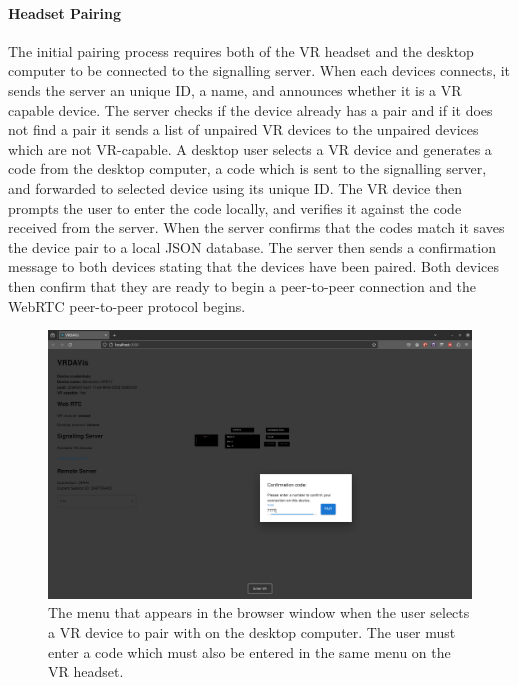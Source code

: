 
\paragraph{Headset Pairing}
The initial pairing process requires both of the VR headset and the desktop computer to be connected to the signalling server. 
When each devices connects, it sends the server an unique ID, a name, and announces whether it is a VR capable device. 
The server checks if the device already has a pair and if it does not find a pair it sends a list of unpaired VR devices to the unpaired devices which are not VR-capable. 
A desktop user selects a VR device and generates a code from the desktop computer, a code which is sent to the signalling server, and forwarded to selected device using its unique ID. 
The VR device then prompts the user to enter the code locally, and verifies it against the code received from the server.
When the server confirms that the codes match it saves the device pair to a local JSON database.
The server then sends a confirmation message to both devices stating that the devices have been paired.
Both devices then confirm that they are ready to begin a peer-to-peer connection and the WebRTC peer-to-peer protocol begins.

\begin{figure}
    \centering
    \includegraphics[width=\linewidth]{figures/screenshots/3.png}
    \caption{The menu that appears in the browser window when the user selects a VR device to pair with on the desktop computer. The user must enter a code which must also be entered in the same menu on the VR headset.}
    \label{fig:screenshot-3}
\end{figure}

